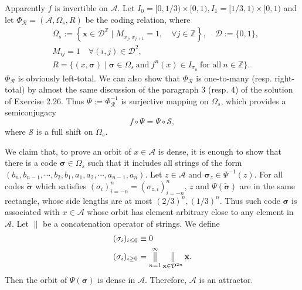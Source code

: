 \documentclass[a4paper,11pt,fleqn]{article}
\newcommand{\catop}{\mathop{\big \|}\limits}
\begin{document}
Apparently $f$ is invertible on $\mathcal{A}$. Let $I_0 = [0,1/3)\times [0,1), I_1 = [1/3,1)\times [0,1)$ and let $\Phi_{\mathcal R} =  (\mathcal{A},\Omega_s,R)$ be the coding relation, where
\begin{align}
&\Omega_s:=\left\{\mathbf{x} \in \mathcal{D}^{\mathbb{Z}} \mid M_{x_j, x_{j+1}}=1, \quad \forall j \in \mathbb{Z}\right\}, \quad \mathcal{D}:=\{0,1\}, \\
&M_{ij} = 1 \quad \forall (i,j) \in \mathcal{D}^2, \\
&R = \{(x,{\bm \sigma}) \mid {\bm \sigma} \in \Omega_s \ \text{and} \ f^n(x) \in I_{{\sigma}_n} \ \text{for all} \ n \in \mathbb{Z}\}.
\end{align}
$\Phi_{\mathcal R}$ is obviously left-total. We can also show that $\Phi_{\mathcal R}$ is one-to-many (resp. right-total) by almost the same discussion of the paragraph 3 (resp. 4) of the solution of Exercise 2.26. Thus $\Psi:=\Phi_{\mathcal R}^{-1}$ is surjective mapping on $\Omega_s$, which provides a semiconjugacy  
\begin{equation}
    f\circ \Psi = \Psi\circ \mathcal{S}, 
\end{equation} 
where $\mathcal{S}$ is a full shift on $\Omega_s$. 

We claim that, to prove an orbit of $x \in \mathcal{A}$ is dense, it is enough to show that there is a code ${\bm \sigma} \in \Omega_s$ such that it includes all strings of the form $(b_n,b_{n-1},\cdots,b_2,b_1,a_1,a_2,\cdots,a_{n-1},a_n)$. Let $z\in\mathcal{A}$ and ${\bm \sigma}_z \in \Psi^{-1}(z)$. For all codes $\tilde{\bm \sigma}$ which satisfies $({\sigma_i})_{i=-n}^n = ({\sigma_{z,i}})_{i=-n}^n$, $z$ and $\Psi(\tilde{\bm \sigma})$ are in the same rectangle, whose side lengths are at most $(2/3)^n,(1/3)^n$. Thus such code ${\bm \sigma}$ is associated with $x \in \mathcal{A}$ whose orbit has element arbitrary close to any element in $\mathcal{A}$. 
Let $\|$ be a concatenation operator of strings. We define 
\begin{align}
    &(\sigma_i)_{i\le 0} \equiv 0 \\
    &(\sigma_i)_{i\ge 0} = \catop_{n=1}^\infty\catop_{{\bf x}\in \mathcal{D}^{2n}}{{\bf x}}.
\end{align}
Then the orbit of $\Psi({\bm \sigma})$ is dense in $\mathcal{A}$. Therefore, $\mathcal{A}$ is an attractor. 
\end{document}
